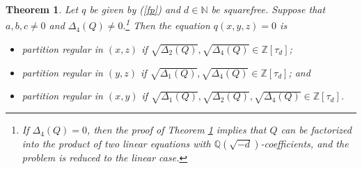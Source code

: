 \documentclass[11pt]{amsart}
\newtheorem{theorem}[lemma]{Theorem}
\newtheorem{corollary}[lemma]{Corollary}
\theoremstyle{definition}
\newcommand{\N}{{\mathbb N}}
\newcommand{\Q}{{\mathbb Q}}
\newcommand{\Z}{{\mathbb Z}}
\newcommand{\AK}[1]{{\color{ForestGreen}{{#1}}}}
\begin{document}



\iffalse

\begin{theorem}\label{th2}
    Let $q$ be given by (\ref{fp}) and $d\in\N$ be squarefree. 
     Suppose that $a,b,c\neq 0$ and $\Delta_{4}(Q)\neq 0.$\footnote{If $\Delta_{4}(Q)=0$, then the proof of Theorem \ref{th2} implies that $Q$ can be factorized into the product of two linear equations with $\Q(\sqrt{-d})$-coefficients, and the problem is reduced to the linear case.} Then the   equation $q(x,y,z)=0$ is  
\begin{itemize}
    \item partition regular in $(x,z)$ if $\sqrt{\Delta_{2}(Q)},\sqrt{\Delta_{4}(Q)}\in\Z[\tau_{d}]$;
    \item partition regular in $(y,z)$ if $\sqrt{\Delta_{1}(Q)},\sqrt{\Delta_{4}(Q)}\in\Z[\tau_{d}]$; and
    \item partition regular in $(x,y)$ if $\sqrt{\Delta_{1}(Q)},\sqrt{\Delta_{2}(Q)},\sqrt{\Delta_{4}(Q)}\in\Z[\tau_{d}]$.
\end{itemize}
\end{theorem}
\end{document}
